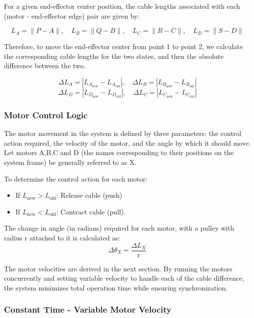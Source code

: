\documentclass[11pt]{article}
\begin{document}
\vspace{0.2cm}
\noindent
For a given end-effector center position, the cable lengths associated with each (motor - end-effector edge) pair are given by:

\[
L_{A} = \| P - A \|, \quad
L_{B} = \| Q - B \|, \quad
L_{C} = \| R - C \|, \quad
L_{D} = \| S - D \|
\]

\vspace{0.2cm}
\noindent
Therefore, to move the end-effector center from point 1 to point 2, we calculate the corresponding cable lengths for the two states, and then the absolute difference between the two.

\[
\Delta L_{A} = \left| L_{A_{\text{new}}} - L_{A_{\text{old}}} \right|, \quad
\Delta L_{B} = \left| L_{B_{\text{new}}} - L_{B_{\text{old}}} \right|
\]
\[
\Delta L_{D} = \left| L_{D_{\text{new}}} - L_{D_{\text{old}}} \right|, \quad
\Delta L_{C} = \left| L_{C_{\text{new}}} - L_{C_{\text{old}}} \right|
\]

\subsubsection*{Motor Control Logic}

The motor movement in the system is defined by three parameters: the control action required, the velocity of the motor, and the angle by which it should move. Let motors A,B,C and D (the names corresponding to their positions on the system frame) be generally referred to as X.

\vspace{0.2cm}
\noindent
To determine the control action for each motor:
\begin{itemize}
    \item If \( L_{\text{new}} > L_{\text{old}} \): Release cable (push)
    \item If \( L_{\text{new}} < L_{\text{old}} \): Contract cable (pull).
\end{itemize}

\noindent
The change in angle (in radians) required for each motor, with a pulley with radius r attached to it is calculated as:
\[
\Delta \theta_{X} = \frac{\Delta L_{X}}{\text{r}}
\]

\noindent
The motor velocities are derived in the next section. By running the motors concurrently and setting variable velocity to handle each of the cable difference, the system minimizes total operation time while ensuring synchronization.

\subsubsection*{Constant Time - Variable Motor Velocity}
\end{document}

